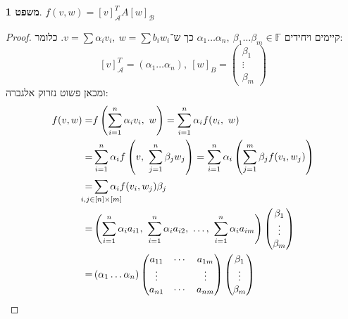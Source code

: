 \documentclass[a4paper]{article}
\newcommand\ac    {\mathcal{A}}
\newcommand\bc    {\mathcal{B}}
\newcommand\F         {\mathbb{F}}
\newcommand\pms[1]    {\begin{pmatrix}
		#1
\end{pmatrix}}
\newcommand\ag        {\alpha}
\newcommand\bg        {\beta}
\newcommand\cl [1]    {\left ( #1 \right )}
\theoremstyle{definition}
\newtheorem{Theorem}{\color{myblue}משפט}
\newcommand\theo  [1] {\begin{Theorem}#1\end{Theorem}}
\begin{document}
	\theo{$f(v, w) = [v]_{\ac}^T A [w]_\bc$}
	\begin{proof}
		
		קיימים ויחידים $\ag_1 \dots \ag_n, \ \bg_1 \dots \bg_m \in \F$ כך ש־$v = \sum \ag_i v_i, \ w = \sum b_iw_i$. 
		כלומר: 
		\[ [v]_\ac^T = (\ag_1 \dots \ag_n), \ [w]_B = \pms{\bg_1 \\ \vdots \\ \bg_m} \]
		ומכאן פשוט נזרוק אלגברה: 
		\begin{align*}
			f(v, w) = &f\cl{\sum_{i = 1}^{n}\ag_i v_i, \ w} = \sum_{i = 1}^{n}\ag_i f(v_i, \ w) \\
			= &\sum_{i = 1}^{n}\ag_i f\cl{v, \ \sum_{j = 1}^{n}\bg_j w_j} = \sum_{i = 1}^{n}\ag_i \cl{\sum_{j = 1}^{m}\bg_j f(v_i, w_j)} \\
			= &\sum_{\mathclap{i, j \in [n] \times [m]}} \ag_i f(v_i, w_j)\bg_j \\
			= &\cl{\sum_{i = 1}^{n}\ag_i a_{i1}, \ \sum_{i = 1}^{n}\ag_i a_{i2}, \ \dots, \ \sum_{i = 1}^{n}\ag_i a_{im}}\pms{\bg_1 \\ \vdots \\ \bg_m} \\
			= &\,(\ag_1 \dots \ag_n)\pms{a_{11} &\cdots &a_{1m} \\ \vdots && \vdots \\ a_{n1} & \cdots & a_{nm}}\pms{\bg_1 \\ \vdots \\ \bg_{m}} 
		\end{align*}
	\end{proof}
	
\end{document}
